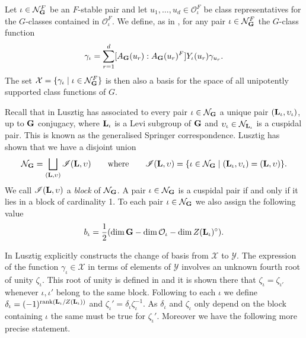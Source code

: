 \documentclass{jt-calcs}
\newcommand{\bl}[1]{\ensuremath{\mathscr{#1}}}
\begin{document}
Let $\iota \in \mathcal{N}_{\mathbf{G}}^F$ be an $F$-stable pair and let $u_1,\dots,u_d \in \mathcal{O}_{\iota}^F$ be class representatives for the $G$-classes contained in $\mathcal{O}_{\iota}^F$. We define, as in \cite[7.5]{lusztig:1992:a-unipotent-support}, for any pair $\iota \in \mathcal{N}_{\mathbf{G}}^F$ the $G$-class function
\begin{equation*}
\gamma_{\iota} = \sum_{r=1}^d [ A_{\mathbf{G}}(u_r) : A_{\mathbf{G}}(u_r)^F]Y_{\iota}(u_r)\gamma_{u_r}.
\end{equation*}
The set $\mathcal{X} = \{\gamma_{\iota} \mid \iota \in \mathcal{N}_{\mathbf{G}}^F\}$ is then also a basis for the space of all unipotently supported class functions of $G$.

Recall that in \cite{lusztig:1984:intersection-cohomology-complexes} Lusztig has associated to every pair $\iota \in \mathcal{N}_{\mathbf{G}}$ a unique pair $(\mathbf{L}_{\iota},\upsilon_{\iota})$, up to $\mathbf{G}$ conjugacy, where $\mathbf{L}_{\iota}$ is a Levi subgroup of $\mathbf{G}$ and $\upsilon_{\iota} \in \mathcal{N}_{\mathbf{L}_{\iota}}$ is a cuspidal pair. This is known as the generalised Springer correspondence. Lusztig has shown that we have a disjoint union
\begin{equation*}
\mathcal{N}_{\bG} = \bigsqcup_{(\bL,\upsilon)} \bl{I}(\bL,\upsilon) \qquad\text{where}\qquad \bl{I}(\bL,\upsilon) = \{\iota \in \mathcal{N}_{\bG} \mid (\bL_{\iota},\upsilon_{\iota}) = (\bL,\upsilon)\}.
\end{equation*}
We call $\bl{I}(\bL,\upsilon)$ a \emph{block} of $\mathcal{N}_{\mathbf{G}}$. A pair $\iota \in \mathcal{N}_{\mathbf{G}}$ is a cuspidal pair if and only if it lies in a block of cardinality 1. To each pair $\iota \in \mathcal{N}_{\mathbf{G}}$ we also assign the following value
\begin{equation*}
b_{\iota} = \frac{1}{2}(\dim \mathbf{G} - \dim \mathcal{O}_{\iota} - \dim Z(\mathbf{L}_{\iota})^{\circ}).
\end{equation*}

In \cite[Theorem 7.3]{lusztig:1992:a-unipotent-support} Lusztig explicitly constructs the change of basis from $\mathcal{X}$ to $\mathcal{Y}$. The expression of the function $\gamma_{\iota} \in \mathcal{X}$ in terms of elements of $\mathcal{Y}$ involves an unknown fourth root of unity $\zeta_{\iota}$. This root of unity is defined in \cite[Proposition 7.2]{lusztig:1992:a-unipotent-support} and it is shown there that $\zeta_{\iota} = \zeta_{\iota'}$ whenever $\iota,\iota'$ belong to the same block. Following \cite[8.4]{lusztig:1992:a-unipotent-support} to each $\iota$ we define $\delta_{\iota} = (-1)^{\operatorname{rank}(\mathbf{L}_{\iota}/Z(\mathbf{L}_{\iota}))}$ and $\zeta_{\iota}' = \delta_{\iota}\zeta_{\iota}^{-1}$. As $\delta_{\iota}$ and $\zeta_{\iota}$ only depend on the block containing $\iota$ the same must be true for $\zeta_{\iota}'$. Moreover we have the following more precise statement.
\end{document}
